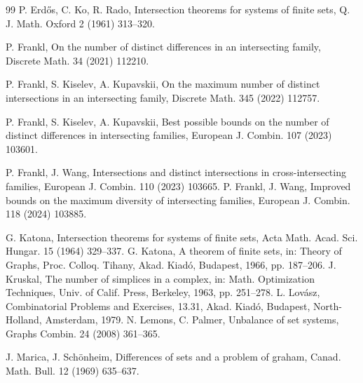\documentclass[11pt]{article}
\numberwithin{equation}{section}
\begin{document}
\begin{thebibliography}{99}
P. Erd{\H{o}}s, C. Ko, R. Rado, Intersection theorems for systems of finite sets, Q. J. Math. Oxford 2 (1961) 313--320.

P. Frankl, On the number of distinct differences in an intersecting family, 
Discrete Math. 34  (2021) 112210.


P. Frankl, S. Kiselev, A. Kupavskii,
On the maximum number of distinct intersections in an intersecting family,
Discrete Math. 345 (2022) 112757.



P. Frankl, S. Kiselev, A. Kupavskii, Best possible bounds on the number of distinct differences in intersecting families, European J. Combin.  107 (2023) 103601.

P. Frankl, J. Wang,
Intersections and distinct intersections in cross-intersecting families,
European J. Combin. 110 (2023) 103665.
P. Frankl, J. Wang, Improved bounds on the maximum diversity of intersecting families, 
European J. Combin. 118 (2024) 103885.

G. Katona, Intersection theorems for systems of finite sets, Acta Math. Acad. Sci. Hungar. 15 (1964) 329--337.
G.  Katona, A theorem of finite sets, in: Theory of Graphs, Proc. Colloq. Tihany, Akad. Kiad\'{o}, Budapest, 1966, pp. 187--206.
J.  Kruskal, The number of simplices in a complex, in: Math. Optimization Techniques, Univ. of Calif. Press, Berkeley, 1963, pp. 251--278.
L. Lov{\'a}sz,  Combinatorial Problems and Exercises, 13.31, 
Akad. Kiad{\'o}, Budapest, North-Holland, Amsterdam, 1979.
 N. Lemons, C. Palmer, 
 Unbalance of set systems, 
 Graphs Combin. 24 (2008) 361--365.

 J. Marica, J. Sch\"onheim, Differences of sets and a problem of graham, Canad. Math. Bull. 12 (1969) 635--637.

\end{thebibliography}
\end{document}
